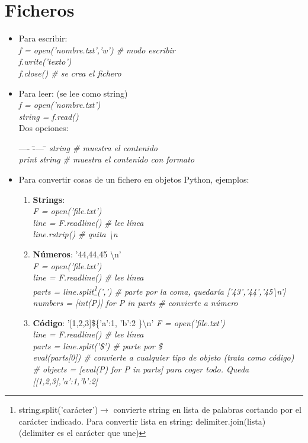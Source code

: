 \section{Ficheros}

	\begin{itemize}
	\item Para escribir: \\
	\textit{f = open('nombre.txt','w') \# modo escribir \\
	f.write('texto') \\
	f.close() \# se crea el fichero}

	\item Para leer: (se lee como string)\\ 
	\textit{	f = open('nombre.txt')\\
	string = f.read()}\\

	\noindent Dos opciones:
	\begin{tabbing}
	---- \= ---- \= \kill  
	\> \textit{string \# muestra el contenido}\\
	\> \textit{print string \# muestra el contenido con formato}
	\end{tabbing}

	\item Para convertir cosas de un fichero en objetos Python, ejemplos:

		\begin{enumerate}
		\item \textbf{Strings}:\\
		\textit{F = open('file.txt')\\
		line = F.readline() \# lee línea \\ 
		line.rstrip() \# quita \textbackslash n}

		\item \textbf{Números}: '44,44,45 \textbackslash n' \\
		\textit{F = open('file.txt')\\
		line = F.readline() \# lee línea \\ 
		parts = line.split\footnote{string.split('carácter')$\rightarrow$ convierte string en lista de palabras cortando por el carácter indicado. Para convertir lista en string: delimiter.join(lista) (delimiter es el carácter que une)}(',') \# parte por la coma, quedaría ['43','44','45\textbackslash n']\\
		numbers = [int(P)] for P in parts \# convierte a número}

		\item \textbf{Código}: '[1,2,3]\$\{'a':1, 'b':2 \}\textbackslash n'
		\textit{F = open('file.txt')\\
		line = F.readline() \# lee línea \\ 
		parts = line.split('\$') \# parte por \$ \\
		eval(parts[0]) \# convierte a cualquier tipo de objeto (trata como código)
		\# objects = [eval(P) for P in parts] para coger todo. Queda [[1,2,3],{'a':1,'b':2}]}


\end{enumerate}
\end{itemize}
